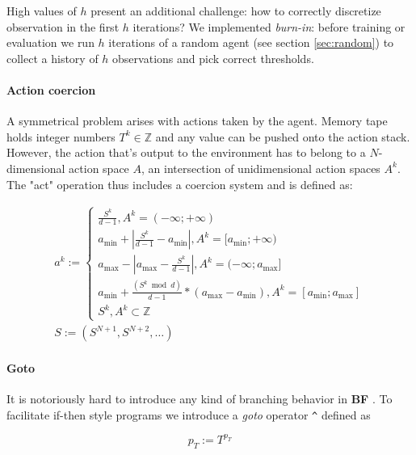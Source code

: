 High values of $h$ present an additional challenge: how to correctly discretize observation in the first $h$ iterations?
We implemented \textit{burn-in}: before training or evaluation we run $h$ iterations of a random agent (see section \ref{sec:random}) to collect a history of $h$ observations and pick correct thresholds.

\paragraph{Action coercion}
\label{sec:act}

A symmetrical problem arises with actions taken by the agent. 
Memory tape holds integer numbers $T^k \in \mathbb{Z}$ and any value can be pushed onto the action stack.
However, the action that's output to the environment has to belong to a $N$-dimensional action space $A$, an intersection of unidimensional action spaces $A^k$.
The "act" operation thus includes a coercion system and is defined as:

\begin{equation}
\label{eq:act}
\begin{array}{l}
    a^k := \begin{cases}
\frac{S^k}{d-1}, A^k = (- \infty; + \infty) \\
a_{\text{min}} + |\frac{S^k}{d-1} - a_{\text{min}}|, A^k = [a_{\text{min}}; + \infty) \\
a_{\text{max}} - |a_{\text{max}} - \frac{S^k}{d-1}|, A^k = (- \infty; a_{\text{max}}] \\
a_{\text{min}} + \frac{(S^k \bmod d)}{d - 1} * (a_{\text{max}} - a_{\text{min}}), A^k = [a_{\text{min}}; a_{\text{max}}] \\
S^k, A^k \subset \mathbb{Z}
\end{cases} \\
    S := (S^{N+1}, S^{N+2}, \dots)
\end{array}
\end{equation}

\paragraph{Goto}
\label{sec:goto}

It is notoriously hard to introduce any kind of branching behavior in \textbf{BF} \cite{brainfuck-control}.
To facilitate if-then style programs we introduce a \textit{goto} operator \verb|^| defined as 

\begin{equation}
   p_T := T^{p_T} 
\end{equation}

